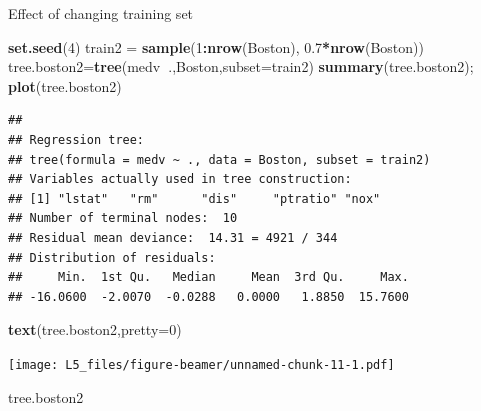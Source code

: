 \documentclass[
  ignorenonframetext,
]{beamer}
\newenvironment{Shaded}{\begin{snugshade}}{\end{snugshade}}
\newcommand{\DataTypeTok}[1]{\textcolor[rgb]{0.13,0.29,0.53}{#1}}
\newcommand{\DecValTok}[1]{\textcolor[rgb]{0.00,0.00,0.81}{#1}}
\newcommand{\FloatTok}[1]{\textcolor[rgb]{0.00,0.00,0.81}{#1}}
\newcommand{\KeywordTok}[1]{\textcolor[rgb]{0.13,0.29,0.53}{\textbf{#1}}}
\newcommand{\NormalTok}[1]{#1}
\newcommand{\OperatorTok}[1]{\textcolor[rgb]{0.81,0.36,0.00}{\textbf{#1}}}
\newcommand{\StringTok}[1]{\textcolor[rgb]{0.31,0.60,0.02}{#1}}
\begin{document}
\begin{frame}[fragile]

\begin{block}{Effect of changing training set}

\begin{Shaded}
\begin{Highlighting}[]
\KeywordTok{set.seed}\NormalTok{(}\DecValTok{4}\NormalTok{)}
\NormalTok{train2 =}\StringTok{ }\KeywordTok{sample}\NormalTok{(}\DecValTok{1}\OperatorTok{:}\KeywordTok{nrow}\NormalTok{(Boston), }\FloatTok{0.7}\OperatorTok{*}\KeywordTok{nrow}\NormalTok{(Boston))}
\NormalTok{tree.boston2=}\KeywordTok{tree}\NormalTok{(medv}\OperatorTok{~}\NormalTok{.,Boston,}\DataTypeTok{subset=}\NormalTok{train2)}
\KeywordTok{summary}\NormalTok{(tree.boston2); }\KeywordTok{plot}\NormalTok{(tree.boston2)}
\end{Highlighting}
\end{Shaded}

\begin{verbatim}
## 
## Regression tree:
## tree(formula = medv ~ ., data = Boston, subset = train2)
## Variables actually used in tree construction:
## [1] "lstat"   "rm"      "dis"     "ptratio" "nox"    
## Number of terminal nodes:  10 
## Residual mean deviance:  14.31 = 4921 / 344 
## Distribution of residuals:
##     Min.  1st Qu.   Median     Mean  3rd Qu.     Max. 
## -16.0600  -2.0070  -0.0288   0.0000   1.8850  15.7600
\end{verbatim}

\begin{Shaded}
\begin{Highlighting}[]
\KeywordTok{text}\NormalTok{(tree.boston2,}\DataTypeTok{pretty=}\DecValTok{0}\NormalTok{)}
\end{Highlighting}
\end{Shaded}

\texttt{[image: L5\_files/figure-beamer/unnamed-chunk-11-1.pdf]}

\begin{Shaded}
\begin{Highlighting}[]
\NormalTok{tree.boston2}
\end{Highlighting}
\end{Shaded}


\end{block}
\end{frame}
\end{document}
